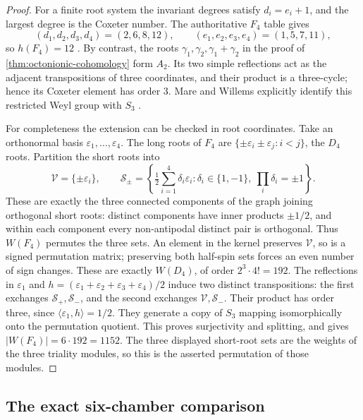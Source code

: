 \documentclass[11pt]{article}
\theoremstyle{definition}
\begin{document}
\begin{proof}
For a finite root system the invariant degrees satisfy \(d_i=e_i+1\),
and the largest degree is the Coxeter number.  The authoritative \(F_4\)
table gives
\[
 (d_1,d_2,d_3,d_4)=(2,6,8,12),
 \qquad(e_1,e_2,e_3,e_4)=(1,5,7,11),
\]
so \(h(F_4)=12\)
\cite[Section~10.1, p.~213, and the table on p.~216]
{KomoriMatsumotoTsumura2023}.  By contrast, the roots
\(\gamma_1,\gamma_2,\gamma_1+\gamma_2\) in the proof of
\cref{thm:octonionic-cohomology} form \(A_2\).  Its two simple reflections
act as the adjacent transpositions of three coordinates, and their product
is a three-cycle; hence its Coxeter element has order \(3\).
Mare and Willems explicitly identify this restricted Weyl group with
\(S_3\) \cite[pp.~492--493]{MareWillems2013}.

For completeness the extension can be checked in root coordinates.
Take an orthonormal basis \(\varepsilon_1,\ldots,\varepsilon_4\).
The long roots of \(F_4\) are
\(\{\pm\varepsilon_i\pm\varepsilon_j:i<j\}\), the \(D_4\) roots.
Partition the short roots into
\[
 \mathcal V=\{\pm\varepsilon_i\},\qquad
 \mathcal S_\pm=
 \left\{\tfrac12\sum_{i=1}^4\delta_i\varepsilon_i:
           \delta_i\in\{1,-1\},\ \prod_i\delta_i=\pm1\right\}.
\]
These are exactly the three connected components of the graph joining
orthogonal short roots: distinct components have inner products
\(\pm1/2\), and within each component every non-antipodal distinct pair
is orthogonal.  Thus \(W(F_4)\) permutes the three sets.  An element in
the kernel preserves \(\mathcal V\), so is a signed permutation matrix;
preserving both half-spin sets forces an even number of sign changes.
These are exactly \(W(D_4)\), of order \(2^3\cdot4!=192\).
The reflections in \(\varepsilon_1\) and
\(h=(\varepsilon_1+\varepsilon_2+\varepsilon_3+\varepsilon_4)/2\)
induce two distinct transpositions: the first exchanges
\(\mathcal S_+,\mathcal S_-\), and the second exchanges
\(\mathcal V,\mathcal S_-\).  Their product has order three, since
\(\langle\varepsilon_1,h\rangle=1/2\).  They generate a copy of
\(S_3\) mapping isomorphically onto the permutation quotient.  This proves
surjectivity and splitting, and gives \(|W(F_4)|=6\cdot192=1152\).
The three displayed short-root sets are the weights of the three triality
modules, so this is the asserted permutation of those modules.
\end{proof}

\subsection{The exact six-chamber comparison}
\end{document}
